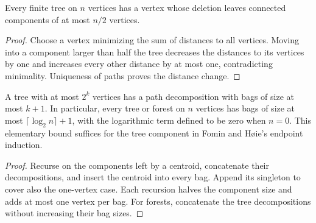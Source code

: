 \begin{theorem}
  \label{thm:lowerbounds-algebraic-tree-centroid}
  \leanok
  Every finite tree on $n$ vertices has a vertex whose deletion leaves
  connected components of at most $n/2$ vertices.
\end{theorem}
\begin{proof}
  \leanok
  Choose a vertex minimizing the sum of distances to all vertices. Moving
  into a component larger than half the tree decreases the distances to
  its vertices by one and increases every other distance by at most one,
  contradicting minimality. Uniqueness of paths proves the distance change.
\end{proof}

\begin{theorem}
  \label{thm:lowerbounds-algebraic-tree-decomposition}
  \leanok
  A tree with at most $2^k$ vertices has a path decomposition with bags of
  size at most $k+1$. In particular, every tree or forest on $n$ vertices
  has bags of size at most $\lceil\log_2 n\rceil+1$, with the logarithmic
  term defined to be zero when $n=0$. This elementary bound suffices for
  the tree component in Fomin and H{\o}ie's endpoint induction.
\end{theorem}
\begin{proof}
  \leanok
  Recurse on the components left by a centroid, concatenate their
  decompositions, and insert the centroid into every bag. Append its
  singleton to cover also the one-vertex case. Each recursion halves the
  component size and adds at most one vertex per bag. For forests,
  concatenate the tree decompositions without increasing their bag sizes.
\end{proof}

